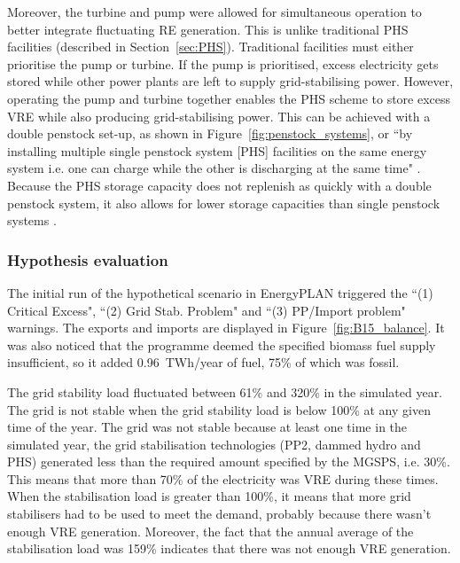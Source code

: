Moreover, the turbine and pump were allowed for simultaneous operation to better integrate fluctuating RE generation.
This is unlike traditional PHS facilities (described in Section~\ref{sec:PHS}).
Traditional facilities must either prioritise the pump or turbine.
If the pump is prioritised, excess electricity gets stored while other power plants are left to supply grid-stabilising power.
However, operating the pump and turbine together enables the PHS scheme to store excess VRE while also producing grid-stabilising power.
This can be achieved with a double penstock set-up, as shown in Figure~\ref{fig:penstock_systems}, or ``by installing multiple single penstock system [PHS] facilities on the same energy system i.e. one can charge while the other is discharging at the same time" \citep[p.~39]{Connolly2015}.
Because the PHS storage capacity does not replenish as quickly with a double penstock system, it also allows for lower storage capacities than single penstock systems \citep{Connolly2015}.













\subsubsection{Hypothesis evaluation}

The initial run of the hypothetical scenario in EnergyPLAN triggered the ``(1) Critical Excess", ``(2) Grid Stab. Problem" and ``(3) PP/Import problem" warnings.
The exports and imports are displayed in Figure~\ref{fig:B15_balance}.
It was also noticed that the programme deemed the specified biomass fuel supply insufficient, so it added 0.96~TWh/year of fuel, 75\% of which was fossil.

The grid stability load fluctuated between 61\% and 320\% in the simulated year.
The grid is not stable when the grid stability load is below 100\% at any given time of the year.
The grid was not stable because at least one time in the simulated year, the grid stabilisation technologies (PP2, dammed hydro and PHS) generated less than the required amount specified by the MGSPS, i.e. 30\%.
This means that more than 70\% of the electricity was VRE during these times.
When the stabilisation load is greater than 100\%, it means that more grid stabilisers had to be used to meet the demand, probably because there wasn't enough VRE generation.
Moreover, the fact that the annual average of the stabilisation load was 159\% indicates that there was not enough VRE generation.

